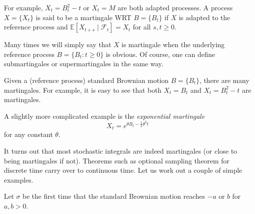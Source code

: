 \documentclass[12pt]{report}
\newcommand{\F}{\mathcal{F}}
\newcommand{\E}{\mathbb{E}}
\begin{document}
    For example, $X_t = B_t^2 - t$ or $X_t = M$ are both adapted processes. A process $X = \{X_t\}$ is said to be a martingale WRT $B = \{B_t\}$ if $X$ is adapted to the reference process and $\E[X_{t+s} \; | \; \F_t] = X_t$ for all $s, t \geq 0$. 

    Many times we will simply say that $X$ is martingale when the underlying reference process $B = \{B_t: t \geq 0\}$ is obvious. Of course, one can define submartingales or supermartingales in the same way.

    Given a (reference process) standard Brownian motion $B= \{B_t\}$, there are many martingales. For example, it is easy to see that both $X_t = B_t$ and $X_t = B_t^2 - t$ are martingales.

    A slightly more complicated example is the \emph{exponential martingale} 
    \[X_t = e^{\theta B_t - \frac{1}{2} \theta^2 t}\]
    for any constant $\theta$. 

    It turns out that most stochastic integrals are indeed martingales (or close to being martingales if not). Theorems such as optional sampling theorem for discrete time carry over to continuous time. Let us work out a couple of simple examples.

    Let $\sigma$ be the first time that the standard Brownian motion reaches $-a$ or $b$ for $a, b > 0$. 
\end{document}

